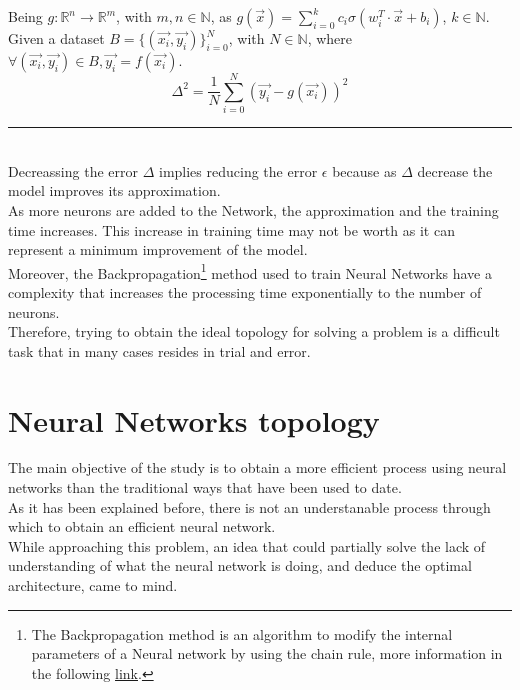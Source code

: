 \documentclass[a4paper, 11pt]{article}
\begin{document}
Being $g:\mathbb{R}^n \rightarrow \mathbb{R}^m$, with $m,n\in\mathbb{N}$, as $g(\vec{x}) = \sum_{i=0}^{k} c_i \sigma \left( w_i^T \cdot \vec{x} + b_i \right)$, $k\in\mathbb{N}$.\\
Given a dataset $B = \{(\vec{x_i},\vec{y_i})\}_{i=0}^{N}$, with $N \in \mathbb{N}$, where $\forall (\vec{x_i},\vec{y_i}) \in B, \vec{y_i} = f(\vec{x_i})$.
$$\Delta^2 = \frac{1}{N} \sum_{i=0}^{N} \left( \vec{y_i} - g(\vec{x_i}) \right)^2$$
\rule{\linewidth}{0.4pt}\\\vspace{0.5em}
Decreassing the error $\Delta$ implies reducing the error $\epsilon$ because as $\Delta$ decrease the model improves its approximation.\\
As more neurons are added to the Network, the approximation and the training time increases. This increase in training time may not be worth as it can represent a minimum improvement of the model.\\
Moreover, the Backpropagation\footnote{The Backpropagation method is an algorithm to modify the internal parameters of a Neural network by using the chain rule, more information in the following \href{https://en.wikipedia.org/wiki/Backpropagation}{link}.} method used to train Neural Networks have a complexity that increases the processing time exponentially to the number of neurons.\\
Therefore, trying to obtain the ideal topology for solving a problem is a difficult task that in many cases resides in trial and error.

\section{Neural Networks topology}
The main objective of the study is to obtain a more efficient process using neural networks than the traditional ways that have been used to date.\\
As it has been explained before, there is not an understanable process through which to obtain an efficient neural network.\\
While approaching this problem, an idea that could partially solve the lack of understanding of what the neural network is doing, and deduce the optimal architecture, came to mind. 
\end{document}
